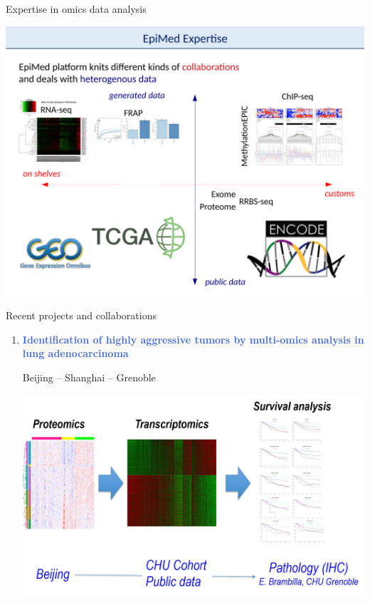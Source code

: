 \documentclass[final]{beamer}
\newlength{\twocolwid}
\begin{document}
\begin{frame}[t]
\begin{columns}[t]
\begin{column}{\twocolwid}
\begin{block}{Expertise in omics data analysis}
{
\centering
\mbox{\includegraphics[trim = 0mm 0mm 0mm 43mm, clip, width=.99\linewidth]{figs/fig04}}

}

\end{block}







\begin{block}{Recent projects and collaborations}

\begin{enumerate}
	
	\item \textcolor{RoyalBlue}{\textbf{Identification of highly aggressive tumors by multi-omics analysis in lung adenocarcinoma}}

Beijing -- Shanghai -- Grenoble

\begin{center}
\includegraphics[width=\linewidth]{figs/proteomics_transcriptomics}
\end{center}


\end{enumerate}
\end{block}
\end{column}
\end{columns}
\end{frame}
\end{document}
